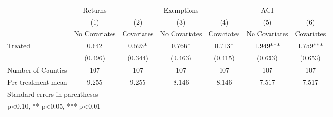 {
\def\sym#1{\ifmmode^{#1}\else\(^{#1}\)\fi}
\begin{tabular}{l*{6}{c}}
\hline\hline
            &     Returns   &               &  Exemptions   &               &         AGI   &               \\
            &\multicolumn{1}{c}{(1)}&\multicolumn{1}{c}{(2)}&\multicolumn{1}{c}{(3)}&\multicolumn{1}{c}{(4)}&\multicolumn{1}{c}{(5)}&\multicolumn{1}{c}{(6)}\\
            &\multicolumn{1}{c}{No Covariates}&\multicolumn{1}{c}{Covariates}&\multicolumn{1}{c}{No Covariates}&\multicolumn{1}{c}{Covariates}&\multicolumn{1}{c}{No Covariates}&\multicolumn{1}{c}{Covariates}\\
\hline
Treated     &       0.642   &       0.593*  &       0.766*  &       0.713*  &       1.949***&       1.759***\\
            &     (0.496)   &     (0.344)   &     (0.463)   &     (0.415)   &     (0.693)   &     (0.653)   \\
\hline
Number of Counties&         107   &         107   &         107   &         107   &         107   &         107   \\
Pre-treatment mean&       9.255   &       9.255   &       8.146   &       8.146   &       7.517   &       7.517   \\
\hline\hline
\multicolumn{7}{l}{\footnotesize Standard errors in parentheses}\\
\multicolumn{7}{l}{\footnotesize * p<0.10, ** p<0.05, *** p<0.01}\\
\end{tabular}
}
